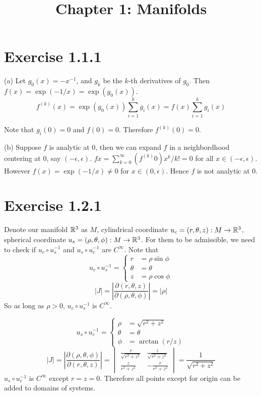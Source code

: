 \documentclass[12pt]{article}
\title{Chapter 1: Manifolds}
\begin{document}
	\maketitle
	
\section*{Exercise 1.1.1}
(a) Let $g_0(x) = -x^{-1}$, and $g_k$ be the $k$-th derivatives of $g_0$. Then $f(x) = \exp(-1/x) = \exp(g_0(x))$. 
$$f^{(k)}(x) =  \exp(g_0(x)) \sum_{i=1}^{k} g_i(x) = f(x) \sum_{i=1}^{k} g_i(x) $$

Note that $g_i(0) = 0$ and $f(0)=0$. Therefore $f^{(k)}(0) = 0$.
\QED

(b) Suppose $f$ is analytic at 0, then we can expand $f$ in a neighbordhood centering at 0, say $(-\epsilon, \epsilon)$. $fx = \sum_{k=0}^{\infty}(f^{(k)}0) x^k/k! = 0$ for all $x \in (-\epsilon, \epsilon)$. However $f(x) = \exp(-1/x) \neq 0$ for $x \in (0, \epsilon)$. Hence $f$ is not analytic at 0. \QED


\section*{Exercise 1.2.1}
Denote our manifold $\mathbb{R}^3$ as $M$, cylindrical coordinate $u_c = (r, \theta, z): M \rightarrow \mathbb{R}^3$, spherical coordinate $u_s = (\rho, \theta, \phi): M \rightarrow \mathbb{R}^3$. For them to be admissible, we need to check if $u_c \circ u_s^{-1}$ and $u_s \circ u_c^{-1}$ are $C^\infty$.
Note that \[
u_c \circ u_s^{-1} = 
 \begin{cases}
 	r &= \rho \sin \phi \\
 	\theta &= \theta \\
 	z &= \rho \cos \phi
 \end{cases}
\]
$$|J| = \left| \frac{\partial (r, \theta, z)}{\partial (\rho, \theta, \phi)} \right| = |\rho| $$
So as long as $\rho > 0$, $u_c \circ u_s^{-1}$ is $C^\infty$.

\[
u_s \circ u_c^{-1} = 
\begin{cases}
	\rho &= \sqrt{r^2 + z^2} \\
	\theta &= \theta \\
	\phi &= \arctan (r/z)
\end{cases}
\]
$$|J| = \left| \frac{\partial  (\rho, \theta, \phi) }{\partial(r, \theta, z)} \right| = \begin{vmatrix}
	\frac{r}{\sqrt{r^2 + z^2}} & \frac{z}{\sqrt{r^2 + z^2}} \\
	\frac{z}{r^2 + z^2} & - \frac{r}{r^2 + z^2} 
\end{vmatrix} 
= \frac{1}{\sqrt{r^2+z^2}}
$$
$u_s \circ u_c^{-1}$ is $C^\infty$ except $r = z = 0$.
Therefore all points except for origin can be added to domains of systems.
\end{document}
